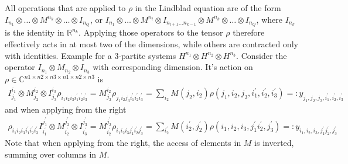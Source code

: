 \documentclass[letterpaper]{article}
\newcommand{\R}{\mathds{R}}
\newcommand{\C}{\mathds{C}}
\newcommand{\p}{\prime}
\begin{document}
All operations that are applied to $\rho$ in the Lindblad equation are of the form $I_{n_1}\otimes \dots \otimes M^{n_k} \otimes \dots \otimes I_{n_Q}$, or $I_{n_1}\otimes \dots \otimes M^{n_l} \otimes I_{n_{l+1}\dots n_{k-1}} \otimes M^{n_k} \otimes \dots \otimes I_{n_Q}$, where $I_{n_k}$ is the identity in $\R^{n_k}$. Applying those operators to the tensor $\rho$ therefore effectively acts in at most two of the dimensions, while others are contracted only with identities. Example for a 3-partite systems $H^{n_1} \otimes H^{n_2} \otimes H^{n_3}$. Consider the operator $I_{n_1} \otimes M_{n_2} \otimes I_{n_3}$ with corresponding dimension. It's action on $\rho \in \C^{n1\times n2\times n3 \times n1\times n2 \times n3}$ is
\begin{align}
    I^{i_1}_{j_1}\otimes M^{i_2}_{j_2} \otimes I^{i_3}_{j_3} \rho_{i_1i_2i_3i_1^{\prime}i_2^\prime i_3^\prime} = M^{i_2}_{j_2} \rho_{j_1i_2j_3i_1^{\prime}i_2^\prime i_3^\prime} = \sum_{i_2} M(j_2, i_2) \rho(j_1,i_2,j_3,i_1^{\prime},i_2^\prime, i_3^\prime)  =: y_{j_1,j_2,j_3,i_1^{\prime},i_2^\prime,i_3^\prime}
\end{align}
and when applying from the right
\begin{align}
    \rho_{i_1i_2i_3i_1^{\prime}i_2^\prime i_3^\prime}I^{j_1^{\prime}}_{i_1^\p}\otimes M^{j_2^\prime}_{i_2^\p} \otimes I^{j_3^\prime}_{i_3^\p}  = M^{j_2^\prime}_{i_2^\prime} \rho_{i_1i_2i_3j_1^{\prime}i_2^\prime j_3^\prime} = \sum_{i_2^\prime} M(i_2^{\prime}, j_2^\prime) \rho(i_1,i_2,i_3,j_1^{\prime}i_2^\prime, j_3^\prime)  =: y_{i_1,i_2,i_3,j_1^{\prime}j_2^\prime, j_3^\prime}
\end{align}
Note that when applying from the right, the access of elements in $M$ is inverted, summing over columns in $M$.
\end{document}
